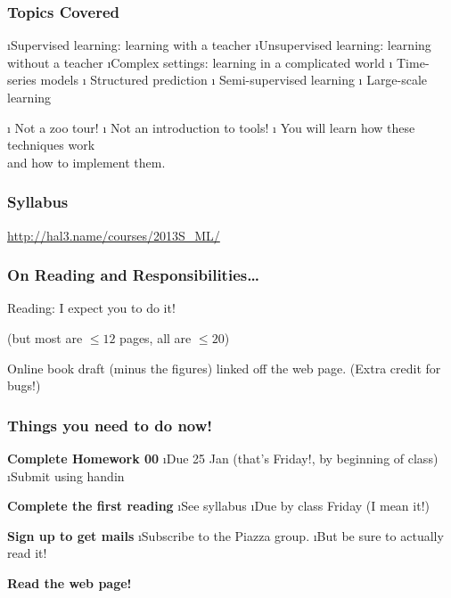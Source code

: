 \documentclass{beamer}
\newcommand{\vsp}{\vspace{1em}}
\newcommand{\blue}[1]{{\color{blue}#1}}
\newcommand{\green}[1]{{\color{DarkGreen}#1}}
\newcommand{\red}[1]{{\color{red}#1}}
\begin{document}
\begin{frame}
\frametitle{Topics Covered}

\bei
\i Supervised learning: \blue{learning with a teacher}
\i Unsupervised learning: \blue{learning without a teacher}
\i Complex settings: \blue{learning in a complicated world}
\bei
\i<2-> Time-series models
\i<2-> Structured prediction
\i<2-> Semi-supervised learning
\i<2-> Large-scale learning
\eni

\vsp
\i<3-> \red{\Large Not a zoo tour!}
\i<3-> \red{\Large Not an introduction to tools!}
\i<4-> \green{\Large You will learn how these techniques work\\and how to implement them.}
\eni
\end{frame}



\begin{frame}
\frametitle{Syllabus}
\vsp
{\Huge \url{http://hal3.name/courses/2013S_ML/}}
\end{frame}

\begin{frame}
\frametitle{On Reading and Responsibilities\dots}

\blue{\Huge Reading: I expect you to do it!}

{\Large (but most are $\leq 12$ pages, all are $\leq 20$)}

Online book draft (minus the figures) linked off the web page.  (Extra
credit for bugs!)

\vsp
\vsp
{}

\end{frame}


\begin{frame}
\frametitle{Things \red{you} need to do \red{now!}}

{\bf Complete Homework 00}
\bei
\i Due 25 Jan (that's \red{Friday!}, by beginning of class)
\i Submit using \blue{handin}
\eni

\vspace{2em}
{\bf Complete the first reading}
\bei
\i See syllabus
\i Due by class Friday (I mean it!)
\eni

\vspace{2em}
{\bf Sign up to get mails}
\bei
\i Subscribe to the Piazza group.
\i But be sure to actually read it!
\eni

\vspace{2em}
{\bf Read the web page!}

\end{frame}
\end{document}
